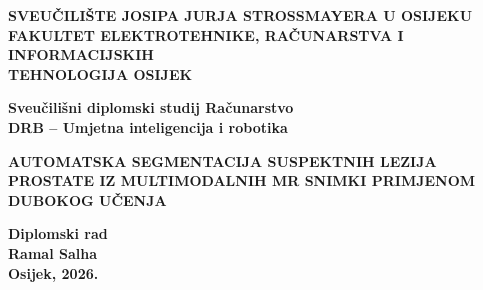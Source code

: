 \documentclass[a4paper,12pt,oneside]{article}
\begin{document}

\setcounter{MaxMatrixCols}{20}                          %
\renewcommand{\baselinestretch}{1.5}                    %
\makeatletter
{}
\makeatother
\renewcommand{\thefigure}{\thesection.\arabic{figure}}  %
\renewcommand{\thetable}{\thesection.\arabic{table}}   %
\renewcommand{\theequation}{\thesection-\arabic{equation}} %
\renewcommand{\refname}{LITERATURA}						%
\hypersetup{pageanchor=false}






\begin{titlepage}

\begin{center}
{\bfseries\fontsize{14}{16}\selectfont SVEUČILIŠTE JOSIPA JURJA STROSSMAYERA U OSIJEKU}\\
{\bfseries\fontsize{14}{16}\selectfont FAKULTET ELEKTROTEHNIKE, RAČUNARSTVA I INFORMACIJSKIH}\\
{\bfseries\fontsize{14}{16}\selectfont TEHNOLOGIJA OSIJEK}\\
\bigskip

\vspace*{2cm}
{\bfseries\fontsize{14}{16}\selectfont Sveučilišni diplomski studij Računarstvo}\\
{\bfseries\fontsize{14}{16}\selectfont DRB -- Umjetna inteligencija i robotika}

\vspace*{5cm}

{\bfseries\fontsize{18}{22}\selectfont AUTOMATSKA SEGMENTACIJA SUSPEKTNIH LEZIJA PROSTATE IZ MULTIMODALNIH MR SNIMKI PRIMJENOM DUBOKOG UČENJA}

\vspace*{1cm}
{\bfseries\fontsize{14}{16}\selectfont Diplomski rad}\\
\vspace*{3cm}
{\bfseries\fontsize{16}{18}\selectfont Ramal Salha}\\
\vfill
{\bfseries\fontsize{14}{16}\selectfont Osijek, 2026.}
\end{center}

\end{titlepage}
\end{document}
